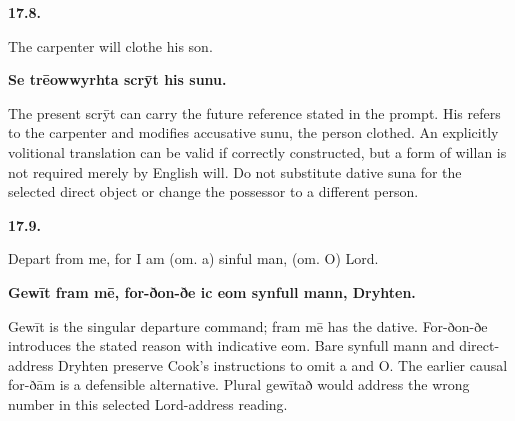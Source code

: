 \par\begin{minipage}{\linewidth}\raggedright
\textbf{17.8.}

The carpenter will clothe his son.

\textbf{Se trēowwyrhta scrȳt his sunu.}

The present scrȳt can carry the future reference stated in the prompt. His refers to the carpenter and modifies accusative sunu, the person clothed. An explicitly volitional translation can be valid if correctly constructed, but a form of willan is not required merely by English will. Do not substitute dative suna for the selected direct object or change the possessor to a different person.

\end{minipage}\par\addvspace{4pt}

\par\begin{minipage}{\linewidth}\raggedright
\textbf{17.9.}

Depart from me, for I am (om. a) sinful man, (om. O) Lord.

\textbf{Gewīt fram mē, for-ðon-ðe ic eom synfull mann, Dryhten.}

Gewīt is the singular departure command; fram mē has the dative. For-ðon-ðe introduces the stated reason with indicative eom. Bare synfull mann and direct-address Dryhten preserve Cook's instructions to omit a and O. The earlier causal for-ðām is a defensible alternative. Plural gewītað would address the wrong number in this selected Lord-address reading.

\end{minipage}\par\addvspace{4pt}

